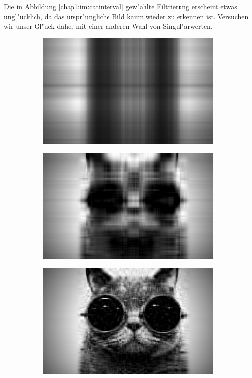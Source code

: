 Die in Abbildung \ref{chap1:im:catinterval} gew"ahlte Filtrierung erscheint etwas ungl"ucklich, da das urspr"ungliche Bild kaum wieder zu erkennen ist.
Versuchen wir unser Gl"uck daher mit einer anderen Wahl von Singul"arwerten.

\newpage

\begin{figure}[h!]
\center
\begin{subfigure}[c]{.3\textwidth}
\includegraphics[width=.9\linewidth]{images/Cat1}
\end{subfigure}
\begin{subfigure}[c]{.3\textwidth}
\includegraphics[width=.9\linewidth]{images/Cat5}
\end{subfigure}
\begin{subfigure}[c]{.3\textwidth}
\includegraphics[width=.9\linewidth]{images/Cat20}
\end{subfigure}


\end{figure}
